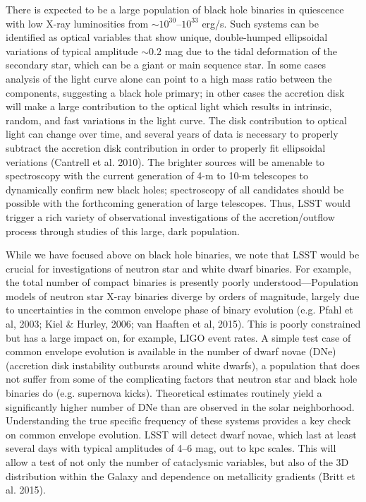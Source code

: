 There is expected to be a large population of black hole binaries in quiescence
with low X-ray luminosities from $\sim 10^{30}$--$10^{33}$ erg/s.
Such systems can be identified as optical variables that show unique,
double-humped ellipsoidal variations of typical amplitude $\sim 0.2$
mag due to the tidal deformation of the secondary star, which can be a
giant or main sequence star. In some cases analysis of the light curve
alone can point to a high mass ratio between the components,
suggesting a black hole primary; in other cases the accretion disk
will make a large contribution to the optical light which results in
intrinsic, random, and fast variations in the light curve. The disk
contribution to optical light can change over time, and several years
of data is necessary to properly subtract the accretion disk
contribution in order to properly fit ellipsoidal veriations (Cantrell
et al. 2010). The brighter sources will be amenable to spectroscopy
with the current generation of 4-m to 10-m telescopes to dynamically
confirm new black holes; spectroscopy of all candidates should be
possible with the forthcoming generation of large telescopes. Thus,
LSST would trigger a rich variety of observational investigations of
the accretion/outflow process through studies of this large, dark
population.

While we have focused above on black hole binaries, we note that LSST
would be crucial for investigations of neutron star and white dwarf
binaries. For example, the total number of compact binaries 
is presently
poorly understood---Population models of neutron star X-ray binaries diverge by orders 
of magnitude, largely due to uncertainties in the common envelope phase of binary evolution (e.g. Pfahl et al, 2003; Kiel \& Hurley, 2006; van Haaften et al, 2015). This is
poorly constrained but has a large impact on, for example, LIGO event
rates. A simple test case of common envelope evolution is available in the number of dwarf novae (DNe) 
(accretion disk instability outbursts around white dwarfs), a population that does not suffer from
some of the complicating factors that neutron star and black hole binaries do (e.g. supernova kicks). 
Theoretical estimates routinely yield a significantly higher number of DNe than are observed in the solar
neighborhood. Understanding the true specific frequency of these
systems provides a key check on common envelope evolution.  LSST will detect dwarf novae, which last at least several days
with typical amplitudes of 4--6 mag,
out to kpc scales. This will allow a test of not only the number of
cataclysmic variables, but also of the 3D distribution within the
Galaxy and dependence on metallicity gradients (Britt et al. 2015).

